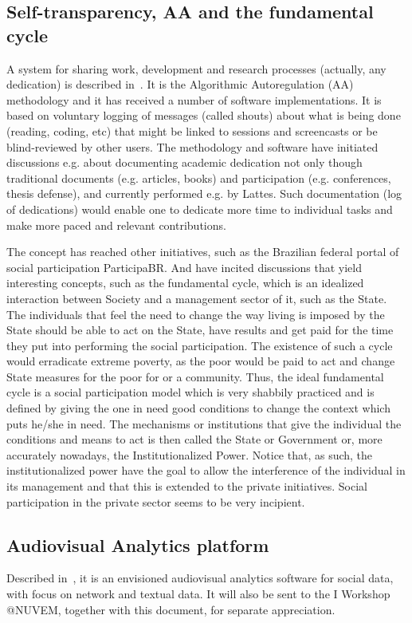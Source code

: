 \documentclass[letterpaper,10pt]{article}
\begin{document}
\subsection{Self-transparency, AA and the fundamental cycle}\label{self}
A system for sharing work, development and research processes
(actually, any dedication)
is described in~\cite{aa,aa2}.
It is the Algorithmic Autoregulation (AA) methodology and it has
received a number of software implementations.
It is based on voluntary logging of messages (called shouts)
about what is being done (reading, coding, etc) that might
be linked to sessions and screencasts or be blind-reviewed
by other users.
The methodology and software have initiated discussions
e.g. about documenting academic dedication not only though
traditional documents (e.g. articles, books) and participation (e.g. conferences, thesis defense),
and currently performed e.g. by Lattes.
Such documentation (log of dedications)
would enable one to dedicate more time to individual
tasks and make more paced and relevant contributions.

The concept has reached other initiatives, such
as the Brazilian federal portal of social participation
ParticipaBR.
And have incited discussions that yield interesting concepts,
such as the fundamental cycle,
which is an idealized interaction between
Society and a management sector of it,
such as the State.
The individuals that feel the need to
change the way living is imposed by the State
should be able to act on the State,
have results and get paid for the time they put
into performing the social participation.
The existence of such a cycle would erradicate
extreme poverty, as the poor would be paid
to act and change State measures for the poor for
or a community.
Thus, the ideal fundamental cycle is a social
participation model which is very shabbily practiced
and is defined by giving the one in need good conditions
to change the context which puts he/she in need.
The mechanisms or institutions that give the
individual the conditions and means to act
is then called the State or Government or,
more accurately nowadays, the Institutionalized Power.
Notice that, as such, the institutionalized power
have the goal to allow the interference 
of the individual in its management
and that this is extended to the private initiatives.
Social participation in the private sector
seems to be very incipient.



\subsection{Audiovisual Analytics platform}
Described in~\cite{nuvem2}, it is an envisioned audiovisual analytics
software for social data, with focus on network and textual data.
It will also be sent to the I Workshop @NUVEM, together with
this document, for separate appreciation.
\end{document}
